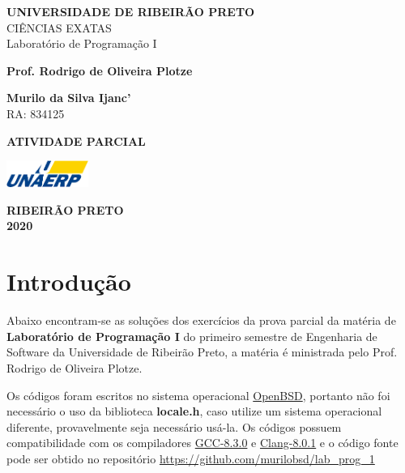 \documentclass[12pt,a4paper]{article}
\let\oldsection\section
\renewcommand\section{\clearpage\oldsection}
\begin{document}
\begin{titlepage}
	\begin{center}
		\textbf{UNIVERSIDADE DE RIBEIRÃO PRETO} \\
			CIÊNCIAS EXATAS \\
			Laboratório de Programação I

			\vspace{1.5cm}

			\textbf{Prof. Rodrigo de Oliveira Plotze}

			\vspace{0.5cm}

			\textbf{Murilo da Silva Ijanc'} \\
			RA: 834125

			\vspace{6.5cm}

			\textbf{ATIVIDADE PARCIAL}

			\vfill

			\vspace{0.8cm}

			\includegraphics[width=0.2\textwidth]{unaerp}

			\textbf{RIBEIRÃO PRETO} \\
			\textbf{2020}
	\end{center}
\end{titlepage}

\thispagestyle{empty}
\tableofcontents

\newpage
\thispagestyle{empty}

\listoffigures
\newpage


\section{Introdução}
Abaixo encontram-se as soluções dos exercícios da prova parcial da matéria
de \textbf{Laboratório de Programação I} do primeiro semestre de Engenharia
de Software da Universidade de Ribeirão Preto, a matéria é ministrada pelo
Prof. Rodrigo de Oliveira Plotze.

Os códigos foram escritos no sistema operacional
\href{https://www.openbsd.org}{OpenBSD}, portanto não foi necessário o uso
da biblioteca \textbf{locale.h}, caso utilize um sistema operacional diferente,
provavelmente seja necessário usá-la. Os códigos possuem compatibilidade com os 
compiladores \href{https://gcc.gnu.org/}{GCC-8.3.0} e 
\href{https://clang.llvm.org/}{Clang-8.0.1} e o código fonte pode ser obtido no
repositório \url{https://github.com/murilobsd/lab\_prog\_1}
\end{document}
